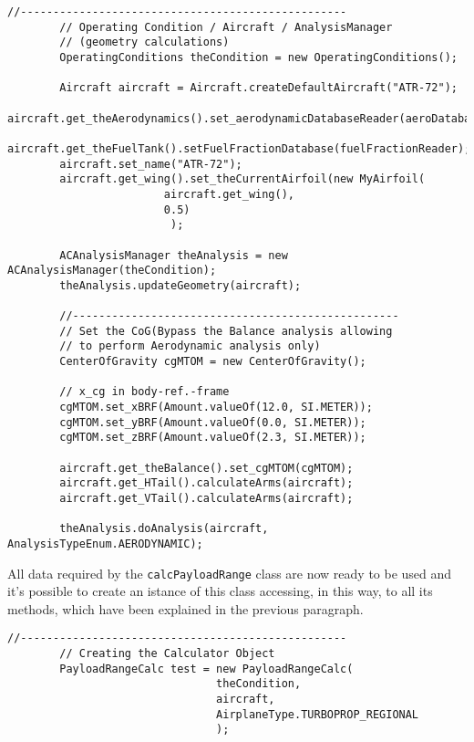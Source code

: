 \begin{lstlisting}[caption={Excerpt of the ATR-72 Payload-Range test - Aircraft, OperatingConditions and ACAnalysisManager setup}, captionpos=b, tabsize=2]
		//--------------------------------------------------
		// Operating Condition / Aircraft / AnalysisManager 
		// (geometry calculations)
		OperatingConditions theCondition = new OperatingConditions();
		
		Aircraft aircraft = Aircraft.createDefaultAircraft("ATR-72");
		aircraft.get_theAerodynamics().set_aerodynamicDatabaseReader(aeroDatabaseReader);
		aircraft.get_theFuelTank().setFuelFractionDatabase(fuelFractionReader);
		aircraft.set_name("ATR-72");
		aircraft.get_wing().set_theCurrentAirfoil(new MyAirfoil(
						aircraft.get_wing(),
						0.5)
						 );		
		
		ACAnalysisManager theAnalysis = new ACAnalysisManager(theCondition);
		theAnalysis.updateGeometry(aircraft);
		
		//--------------------------------------------------
		// Set the CoG(Bypass the Balance analysis allowing
		// to perform Aerodynamic analysis only)
		CenterOfGravity cgMTOM = new CenterOfGravity();

		// x_cg in body-ref.-frame
		cgMTOM.set_xBRF(Amount.valueOf(12.0, SI.METER)); 
		cgMTOM.set_yBRF(Amount.valueOf(0.0, SI.METER));
		cgMTOM.set_zBRF(Amount.valueOf(2.3, SI.METER));

		aircraft.get_theBalance().set_cgMTOM(cgMTOM);
		aircraft.get_HTail().calculateArms(aircraft);
		aircraft.get_VTail().calculateArms(aircraft);
		
		theAnalysis.doAnalysis(aircraft, AnalysisTypeEnum.AERODYNAMIC);
\end{lstlisting}

\bigskip
All data required by the \lstinline[language=Java]!calcPayloadRange! class are now ready to be used and it’s possible to create an istance of this class accessing, in this way, to all its methods, which have been explained in the previous paragraph. 

\bigskip
\begin{lstlisting}[caption={Excerpt of the ATR-72 Payload-Range test - Payload-Range class istance creation}, captionpos=b, tabsize=2]
		//--------------------------------------------------
		// Creating the Calculator Object
		PayloadRangeCalc test = new PayloadRangeCalc(
								theCondition, 
								aircraft,
								AirplaneType.TURBOPROP_REGIONAL
								);
\end{lstlisting}

